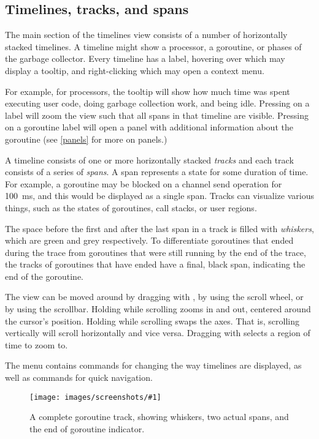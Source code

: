 \documentclass[10pt,letterpaper,oneside,openany,english]{memoir}
\newcommand{\noun}[1]{{\emph{#1}}}
\newcommand{\shortcut}{\ctrl{} or \cmdmac}
\newcommand{\screenshot}[2]{%
\begin{figure}[!ht]
  \centering
  \texttt{[image: images/screenshots/\#1]}
  \caption{#2}
\end{figure}}
\begin{document}
\subsection{Timelines, tracks, and spans}
The main section of the timelines view consists of a number of horizontally stacked timelines.
A timeline might show a processor, a goroutine, or phases of the garbage collector.
Every timeline has a label, hovering over which may display a tooltip, and right-clicking which may open a context menu.

For example, for processors, the tooltip will show how much time was spent executing user code,
doing garbage collection work,
and being idle.
Pressing \keys{\shortcut + LMB} on a label will zoom the view such that all spans in that timeline are visible.
Pressing  on a goroutine label will open a panel with additional information about the goroutine (see \cref{panels} for more on panels.)

A timeline consists of one or more horizontally stacked \noun{tracks}
and each track consists of a series of \noun{spans}.
A span represents a state for some duration of time.
For example, a goroutine may be blocked on a channel send operation for \qty{100}{\milli\second}, and this would be displayed as a single span.
Tracks can visualize various things, such as the states of goroutines, call stacks, or user regions.

The space before the first and after the last span in a track is filled with \noun{whiskers}, which are green and grey respectively.
To differentiate goroutines that ended during the trace from goroutines that were still running by the end of the trace,
the tracks of goroutines that have ended have a final, black span, indicating the end of the goroutine.

The view can be moved around by dragging with , by using the scroll wheel, or by using the scrollbar.
Holding \keys{\shortcut} while scrolling zooms in and out, centered around the cursor's position.
Holding \keys{\shift} while scrolling swaps the axes. That is, scrolling vertically will scroll horizontally and vice versa.
Dragging with \keys{\shortcut + LMB} selects a region of time to zoom to.

The  menu contains commands for changing the way timelines are displayed,
as well as commands for quick navigation.

\screenshot{track_whiskers_spans_end.png}{A complete goroutine track, showing whiskers, two actual spans, and the end of goroutine indicator.}
\end{document}
